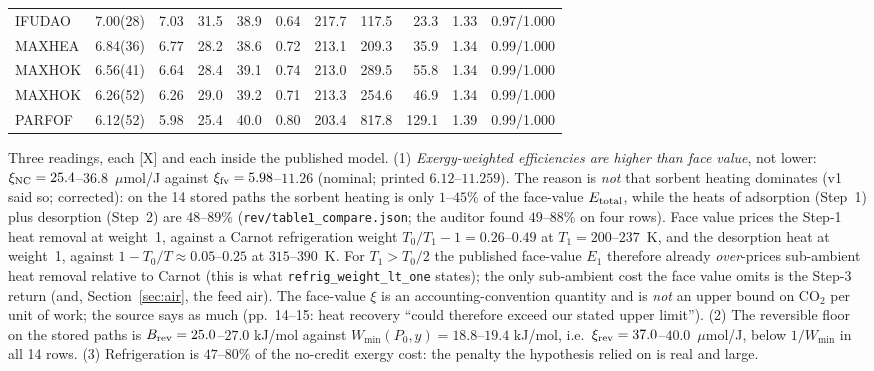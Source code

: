 \documentclass[10pt]{article}
\newcommand{\tier}[1]{\textsf{[#1]}}
\newcommand{\tX}{\tier{X}}
\newcommand{\lean}[1]{\texttt{#1}}
\newcommand{\umolJ}{\ensuremath{\mu}mol/J}
\begin{document}
\begin{table}[h]
\begin{tabular}{llrrrrrrrrr}
IFUDAO & 7.00(28) & 7.03 & 31.5 & 38.9 & 0.64 & 217.7 & 117.5 & 23.3 & 1.33 & 0.97/1.000\\
MAXHEA & 6.84(36) & 6.77 & 28.2 & 38.6 & 0.72 & 213.1 & 209.3 & 35.9 & 1.34 & 0.99/1.000\\
MAXHOK & 6.56(41) & 6.64 & 28.4 & 39.1 & 0.74 & 213.0 & 289.5 & 55.8 & 1.34 & 0.99/1.000\\
MAXHOK & 6.26(52) & 6.26 & 29.0 & 39.2 & 0.71 & 213.3 & 254.6 & 46.9 & 1.34 & 0.99/1.000\\
PARFOF & 6.12(52) & 5.98 & 25.4 & 40.0 & 0.80 & 203.4 & 817.8 & 129.1 & 1.39 & 0.99/1.000\\
\bottomrule
\end{tabular}
\end{table}
Three readings, each \tX{} and each inside the published model. (1) \emph{Exergy-weighted efficiencies are higher than face value}, not lower: $\xi_{\rm NC}=25.4$--$36.8$~\umolJ{} against $\xi_{\rm fv}=5.98$--$11.26$ (nominal; printed $6.12$--$11.259$). The reason is \emph{not} that sorbent heating dominates (v1 said so; corrected): on the 14 stored paths the sorbent heating is only $1$--$45\%$ of the face-value $E_{\rm total}$, while the heats of adsorption (Step~1) plus desorption (Step~2) are $48$--$89\%$ (\texttt{rev/table1\_compare.json}; the auditor found $49$--$88\%$ on four rows). Face value prices the Step-1 heat removal at weight~1, against a Carnot refrigeration weight $T_0/T_1-1=0.26$--$0.49$ at $T_1=200$--$237$~K, and the desorption heat at weight~1, against $1-T_0/T\approx0.05$--$0.25$ at $315$--$390$~K. For $T_1>T_0/2$ the published face-value $E_1$ therefore already \emph{over}-prices sub-ambient heat removal relative to Carnot (this is what \lean{refrig\_weight\_lt\_one} states); the only sub-ambient cost the face value omits is the Step-3 return (and, Section~\ref{sec:air}, the feed air). The face-value $\xi$ is an accounting-convention quantity and is \emph{not} an upper bound on CO$_2$ per unit of work; the source says as much (pp.~14--15: heat recovery ``could therefore exceed our stated upper limit''). (2) The reversible floor on the stored paths is
$B_{\rm rev}=25.0$--$27.0$ kJ/mol against $W_{\min}(P_0,y)=18.8$--$19.4$ kJ/mol, i.e.\ $\xi_{\rm rev}=37.0$--$40.0$~\umolJ{}, below $1/W_{\min}$ in all 14 rows. (3) Refrigeration is $47$--$80\%$ of the no-credit exergy cost: the penalty the hypothesis relied on is real and large.
\end{document}
